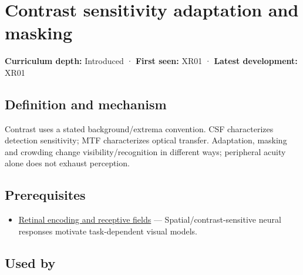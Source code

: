 \hypertarget{appendix-b3aa9e8e01ad}{}\label{referencestart:appendix-b3aa9e8e01ad}
\section{Contrast sensitivity adaptation and masking}\label{appendix-b3aa9e8e01ad-contrast-sensitivity-adaptation-and-masking}

\hypertarget{appendix-b3aa9e8e01ad-contrast-sensitivity-adaptation-and-masking}{}

\textbf{Curriculum depth:} Introduced · \textbf{First seen:} XR01 · \textbf{Latest development:} XR01

\begin{allmightroledefinition}

\subsection{Definition and mechanism}\label{appendix-b3aa9e8e01ad-definition-and-mechanism}

\hypertarget{appendix-b3aa9e8e01ad-definition-and-mechanism}{}

Contrast uses a stated background/extrema convention. CSF characterizes detection sensitivity; MTF characterizes optical transfer. Adaptation, masking and crowding change visibility/recognition in different ways; peripheral acuity alone does not exhaust perception.

\end{allmightroledefinition}

\subsection{Prerequisites}\label{appendix-b3aa9e8e01ad-prerequisites}

\hypertarget{appendix-b3aa9e8e01ad-prerequisites}{}

\begin{itemize}
\tightlist
\item
  \hyperref[appendix-7281c15ac44a]{Retinal encoding and receptive fields} --- Spatial/contrast-sensitive neural responses motivate task-dependent visual models.
\end{itemize}

\subsection{Used by}\label{appendix-b3aa9e8e01ad-used-by}

\hypertarget{appendix-b3aa9e8e01ad-used-by}{}

